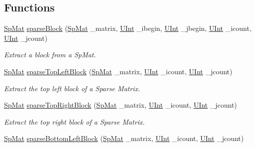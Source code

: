 \subsection*{Functions}
\begin{DoxyCompactItemize}
\item 
\hyperlink{namespaceFVCode3D_ac1032289d96638cf0ad6c52ef639095f}{Sp\+Mat} \hyperlink{namespaceFVCode3D_a50584b1c52af8d3b79fe5b0bcc18b2e1}{sparse\+Block} (\hyperlink{namespaceFVCode3D_ac1032289d96638cf0ad6c52ef639095f}{Sp\+Mat} \+\_\+matrix, \hyperlink{namespaceFVCode3D_a4bf7e328c75d0fd504050d040ebe9eda}{U\+Int} \+\_\+ibegin, \hyperlink{namespaceFVCode3D_a4bf7e328c75d0fd504050d040ebe9eda}{U\+Int} \+\_\+jbegin, \hyperlink{namespaceFVCode3D_a4bf7e328c75d0fd504050d040ebe9eda}{U\+Int} \+\_\+icount, \hyperlink{namespaceFVCode3D_a4bf7e328c75d0fd504050d040ebe9eda}{U\+Int} \+\_\+jcount)
\begin{DoxyCompactList}\small\item\em Extract a block from a Sp\+Mat. \end{DoxyCompactList}\item 
\hyperlink{namespaceFVCode3D_ac1032289d96638cf0ad6c52ef639095f}{Sp\+Mat} \hyperlink{namespaceFVCode3D_a13bcca787028985b3fdbca71334eb63f}{sparse\+Top\+Left\+Block} (\hyperlink{namespaceFVCode3D_ac1032289d96638cf0ad6c52ef639095f}{Sp\+Mat} \+\_\+matrix, \hyperlink{namespaceFVCode3D_a4bf7e328c75d0fd504050d040ebe9eda}{U\+Int} \+\_\+icount, \hyperlink{namespaceFVCode3D_a4bf7e328c75d0fd504050d040ebe9eda}{U\+Int} \+\_\+jcount)
\begin{DoxyCompactList}\small\item\em Extract the top left block of a Sparse Matrix. \end{DoxyCompactList}\item 
\hyperlink{namespaceFVCode3D_ac1032289d96638cf0ad6c52ef639095f}{Sp\+Mat} \hyperlink{namespaceFVCode3D_a4e9be96975d446ebb5e3acd53150bbbb}{sparse\+Top\+Right\+Block} (\hyperlink{namespaceFVCode3D_ac1032289d96638cf0ad6c52ef639095f}{Sp\+Mat} \+\_\+matrix, \hyperlink{namespaceFVCode3D_a4bf7e328c75d0fd504050d040ebe9eda}{U\+Int} \+\_\+icount, \hyperlink{namespaceFVCode3D_a4bf7e328c75d0fd504050d040ebe9eda}{U\+Int} \+\_\+jcount)
\begin{DoxyCompactList}\small\item\em Extract the top right block of a Sparse Matrix. \end{DoxyCompactList}\item 
\hyperlink{namespaceFVCode3D_ac1032289d96638cf0ad6c52ef639095f}{Sp\+Mat} \hyperlink{namespaceFVCode3D_a2b06bf4215f4ce6cbd1a940fbd2ef6e6}{sparse\+Bottom\+Left\+Block} (\hyperlink{namespaceFVCode3D_ac1032289d96638cf0ad6c52ef639095f}{Sp\+Mat} \+\_\+matrix, \hyperlink{namespaceFVCode3D_a4bf7e328c75d0fd504050d040ebe9eda}{U\+Int} \+\_\+icount, \hyperlink{namespaceFVCode3D_a4bf7e328c75d0fd504050d040ebe9eda}{U\+Int} \+\_\+jcount)

\end{DoxyCompactItemize}
